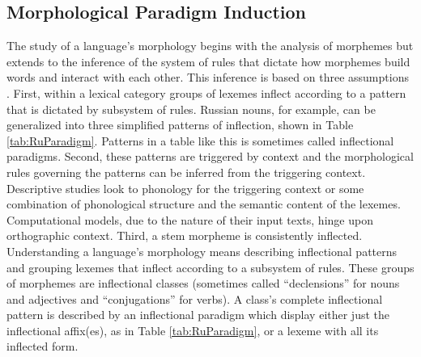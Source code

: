 \documentclass[12pt]{article}
\begin{document}
\subsection{Morphological Paradigm Induction}
\label{paradigms}

The study of a language's morphology begins with the analysis of morphemes but extends to the inference of the system of rules that dictate how morphemes build words and interact with each other. This inference is based on three assumptions \cite{durrett_supervised_2013}. First, within a lexical category groups of lexemes inflect according to a pattern that is dictated by subsystem of rules. Russian nouns, for example, can be generalized into three simplified patterns of inflection, shown in Table \ref{tab:RuParadigm}. Patterns in a table like this is sometimes called inflectional paradigms. Second, these patterns are triggered by context and the morphological rules governing the patterns can be inferred from the triggering context. Descriptive studies look to phonology for the triggering context or some combination of phonological structure and the semantic content of the lexemes. Computational models, due to the nature of their input texts, hinge upon orthographic context. Third, a stem morpheme is consistently inflected. Understanding a language's morphology means describing inflectional patterns and grouping lexemes that inflect according to a subsystem of rules. These groups of morphemes are inflectional classes (sometimes called ``declensions'' for nouns and adjectives and ``conjugations'' for verbs). A class's complete inflectional pattern is described by an inflectional paradigm which display either just the inflectional affix(es), as in Table \ref{tab:RuParadigm}, or a lexeme with all its inflected form. 
\end{document}
